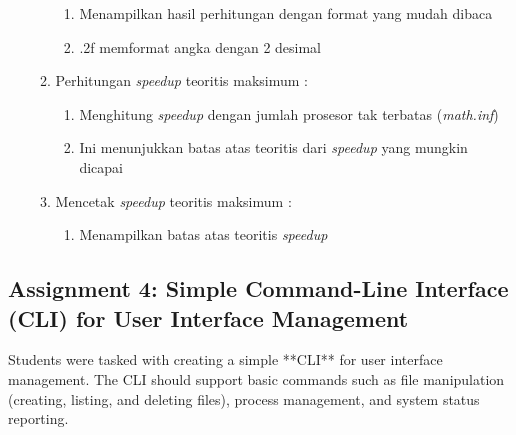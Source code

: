 \documentclass[12pt]{article}
\begin{document}
\begin{enumerate}
\begin{enumerate}
\begin{enumerate}
                \item Menampilkan hasil perhitungan dengan format yang mudah dibaca
                \item .2f memformat angka dengan 2 desimal
            \end{enumerate}
        \item  Perhitungan \textit{speedup} teoritis maksimum :
            \begin{enumerate}
                \item Menghitung \textit{speedup} dengan jumlah prosesor tak terbatas (\textit{math.inf})
                \item Ini menunjukkan batas atas teoritis dari \textit{speedup} yang mungkin dicapai
            \end{enumerate}
        \item Mencetak \textit{speedup} teoritis maksimum :
            \begin{enumerate}
                \item Menampilkan batas atas teoritis \textit{speedup}
            \end{enumerate}


    \end{enumerate}
\end{enumerate}

\subsection{Assignment 4: Simple Command-Line Interface (CLI) for User Interface Management}
Students were tasked with creating a simple **CLI** for user interface management. The CLI should support basic commands such as file manipulation (creating, listing, and deleting files), process management, and system status reporting.
\end{document}
